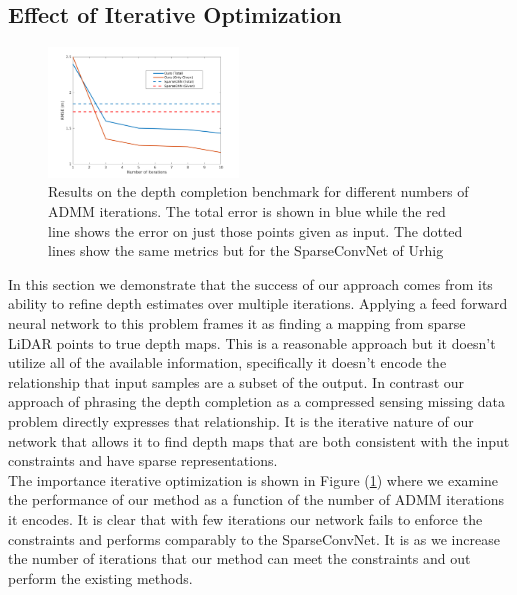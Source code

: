 \subsection{Effect of Iterative Optimization}
\label{sec:effect-iter-optim}
\begin{figure}
  \includegraphics[width=0.45\textwidth]{iterplot}
  \caption{Results on the depth completion benchmark for different numbers of ADMM iterations. The total error is shown in blue while the red line shows the error on just those points given as input. The dotted lines show the same metrics but for the SparseConvNet of Urhig \etal}
  \label{fig:iterplot}
\end{figure}

In this section we demonstrate that the success of our approach comes from its ability to refine depth estimates over multiple iterations. Applying a feed forward neural network to this problem frames it as finding a mapping from sparse LiDAR points to true depth maps. This is a reasonable approach but it doesn't utilize all of the available information, specifically it doesn't encode the relationship that input samples are a subset of the output. In contrast our approach of phrasing the depth completion as a compressed sensing missing data problem directly expresses that relationship. It is the iterative nature of our network that allows it to find depth maps that are both consistent with the input constraints and have sparse representations.\\

The importance iterative optimization is shown in Figure (\ref{fig:iterplot}) where we examine the performance of our method as a function of the number of ADMM iterations it encodes. It is clear that with few iterations our network fails to enforce the constraints and performs comparably to the SparseConvNet. It is as we increase the number of iterations that our method can meet the constraints and out perform the existing methods.



